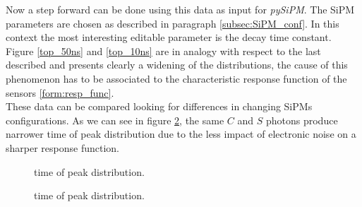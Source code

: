 Now a step forward can be done using this data as input for \textit{pySiPM}. The SiPM parameters are chosen as described in paragraph \ref{subsec:SiPM_conf}. In this context the most interesting editable parameter is the decay time constant.\\ 
Figure \ref{top_50ns} and \ref{top_10ns} are in analogy with respect to the last described and presents clearly a widening of the distributions, the cause of this phenomenon has to be associated to the characteristic response function of the sensors \ref{form:resp_func}.\\
These data can be compared looking for differences in changing SiPMs configurations. As we can see in figure \ref{fig:top_per_fib}, the same $C$ and $S$ photons produce narrower time of peak distribution due to the less impact of electronic noise on a sharper response function.\\

\begin{figure}
	\centering
	 \quad
	\caption{time of peak distribution.}
	\label{fig:top_per_tau}
\end{figure}

\begin{figure}
	\centering
	 \quad
	\caption{time of peak distribution.}
	\label{fig:top_per_fib}
\end{figure}

